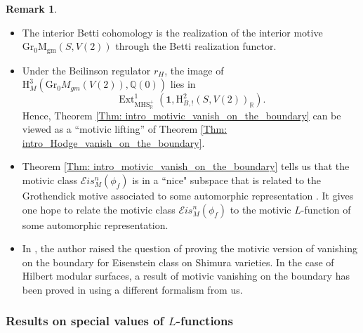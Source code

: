 \documentclass[11pt, a4paper]{amsart}
\theoremstyle{plain}
\theoremstyle{definition}
\newtheorem{remark}[theorem]{Remark}
\numberwithin{equation}{section}
\def\QQ{\mathbb{Q}}
\def\RR{\mathbb{R}}
\DeclareMathOperator{\Ext}{Ext}
\begin{document}
\begin{remark}
    \begin{itemize}
        \item The interior Betti cohomology is the realization of the interior motive $\mathrm{Gr_{0}M_{gm}}(S, V(2))$ through the Betti realization functor. 
        \item Under the Beilinson regulator $r_{H}$, the image of $\mathrm{H}_{M}^{3}(\mathrm{Gr_{0}}M_{gm}(V(2)), \QQ(0))$ lies in 
            \begin{equation*}
                \Ext^{1}_{\mathrm{MHS}_{\RR}^{+}}(\mathbf{1}, \mathrm{H}^{2}_{B,!}(S, V(2))_{\RR}).
            \end{equation*}
        Hence, Theorem \ref{Thm: intro_motivic_vanish_on_the_boundary} can be viewed as a ``motivic lifting'' of Theorem \ref{Thm: intro_Hodge_vanish_on_the_boundary}. 
        \item Theorem \ref{Thm: intro_motivic_vanish_on_the_boundary} tells us that the motivic class $\mathcal{E}is^{n}_{M}(\phi_f)$ is in a ``nice" subspace that is related to the Grothendick motive associated to some automorphic representation \cite[Theorem 5.6]{Wild_15}. It gives one hope to relate the motivic class $\mathcal{E}is^{n}_{M}(\phi_f)$ to the motivic $L$-function of some automorphic representation.
        \item In \cite{Kings98}, the author raised the question of proving the motivic version of vanishing on the boundary for Eisenstein class on Shimura varieties. In the case of Hilbert modular surfaces, a result of motivic vanishing on the boundary has been proved in \cite[Corollary 3.14]{Wild_09_HMS} using a different formalism from us. 
    \end{itemize}
\end{remark}

\subsubsection{Results on special values of $L$-functions}
\end{document}

